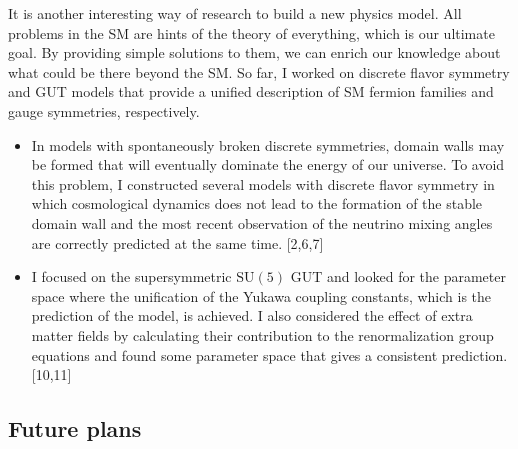 \documentclass[12pt,notitlepage]{article}
\begin{document}
It is another interesting way of research to build a new physics model.
All problems in the SM are hints of the theory of everything, which is our ultimate goal.
By providing simple solutions to them, we can enrich our knowledge about what could be there beyond the SM.
So far, I worked on discrete flavor symmetry and GUT models that provide a unified description of SM fermion families and gauge symmetries, respectively.
\vspace{-1.3mm}
\begin{itemize}
  \setlength{\parskip}{0mm}
  \setlength{\itemsep}{1mm}
  \item
    In models with spontaneously broken discrete symmetries, domain walls may be formed that will eventually dominate the energy of our universe.
    To avoid this problem, I constructed several models with discrete flavor symmetry in which cosmological dynamics does not lead to the formation of the stable domain wall and the most recent observation of the neutrino mixing angles are correctly predicted at the same time. [2,6,7]
  \item
    I focused on the supersymmetric $\mathrm{SU}(5)$ GUT and looked for the parameter space where the unification of the Yukawa coupling constants, which is the prediction of the model, is achieved.
    I also considered the effect of extra matter fields by calculating their contribution to the renormalization group equations and found some parameter space that gives a consistent prediction. [10,11]
\end{itemize}

\vspace*{-2mm}
\subsection*{Future plans}
\end{document}
